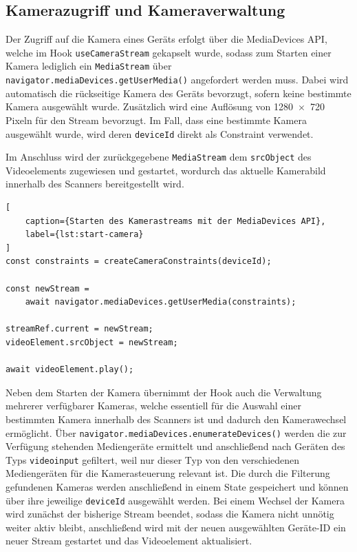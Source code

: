 ﻿\documentclass[oneside]{ausarbeitung}
\begin{document}
\subsection{Kamerazugriff und Kameraverwaltung}
\label{sec:kamerazugriff}

Der Zugriff auf die Kamera eines Geräts erfolgt über die MediaDevices API, welche im Hook \texttt{useCameraStream} gekapselt wurde, sodass zum Starten
einer Kamera lediglich ein \texttt{MediaStream} über \texttt{navigator.mediaDevices.getUserMedia()} angefordert werden muss. Dabei wird automatisch
die rückseitige Kamera des Geräts bevorzugt, sofern keine bestimmte Kamera ausgewählt wurde. Zusätzlich wird eine Auflösung von 1280~$\times$~720
Pixeln für den Stream bevorzugt. Im Fall, dass eine bestimmte Kamera ausgewählt wurde, wird deren \texttt{deviceId} direkt als Constraint verwendet.

Im Anschluss wird der zurückgegebene \texttt{MediaStream} dem \texttt{srcObject} des Videoelements zugewiesen und gestartet, wordurch das aktuelle
Kamerabild innerhalb des Scanners bereitgestellt wird.


\begin{lstlisting}[
    caption={Starten des Kamerastreams mit der MediaDevices API},
    label={lst:start-camera}
]
const constraints = createCameraConstraints(deviceId);

const newStream =
    await navigator.mediaDevices.getUserMedia(constraints);

streamRef.current = newStream;
videoElement.srcObject = newStream;

await videoElement.play();
\end{lstlisting}


Neben dem Starten der Kamera übernimmt der Hook auch die Verwaltung mehrerer verfügbarer Kameras, welche essentiell für die Auswahl einer
bestimmten Kamera innerhalb des Scanners ist und dadurch den Kamerawechsel ermöglicht. Über \texttt{navigator.mediaDevices.enumerateDevices()} werden
die zur Verfügung stehenden Mediengeräte ermittelt und anschließend nach Geräten des Typs \texttt{videoinput} gefiltert, weil nur dieser Typ von den 
verschiedenen Mediengeräten für die Kamerasteuerung relevant ist. Die durch die Filterung gefundenen Kameras werden anschließend in einem State
gespeichert und können über ihre jeweilige \texttt{deviceId} ausgewählt werden. Bei einem Wechsel der Kamera wird zunächst der bisherige Stream
beendet, sodass die Kamera nicht unnötig weiter aktiv bleibt, anschließend wird mit der neuen ausgewählten Geräte-ID ein
neuer Stream gestartet und das Videoelement aktualisiert.
\end{document}
